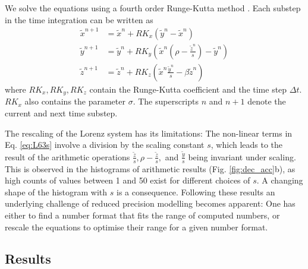 \documentclass[draft]{agujournal2019}
\begin{document}
We solve the equations using a fourth order Runge-Kutta method \cite{Butcher2008}. Each substep in the time integration can be written as 
\begin{subequations}
\begin{align}
\tilde{x}^{n+1} &= \tilde{x}^n + RK_x\left(\tilde{y}^n-\tilde{x}^n\right) \\
\tilde{y}^{n+1} &= \tilde{y}^n + RK_y\left(\tilde{x}^n(\rho - \frac{\tilde{z}^n}{s}) - \tilde{y}^n \right) \\
\tilde{z}^{n+1} &= \tilde{z}^n + RK_z\left(\tilde{x}^n\frac{\tilde{y}^n}{s} - \beta \tilde{z}^n\right)
\end{align}
\label{eq:L63s}%
\end{subequations}
where $RK_x,RK_y,RK_z$ contain the Runge-Kutta coefficient and the time step $\Delta t$.  $RK_x$ also contains the parameter $\sigma$. The superscripts $n$ and $n+1$ denote the current and next time substep.

The rescaling of the Lorenz system has its limitations: The non-linear terms in Eq. \ref{eq:L63s} involve a division by the scaling constant $s$, which leads to the result of the arithmetic operations $\tfrac{\tilde{z}}{s}, \rho - \tfrac{\tilde{z}}{s},$ and $\tfrac{\tilde{y}}{s}$ being invariant under scaling. This is observed in the histograms of arithmetic results (Fig. \ref{fig:dec_acc}b), as high counts of values between 1 and 50 exist for different choices of $s$. A changing shape of the histogram with $s$ is a consequence. Following these results an underlying challenge of reduced precision modelling becomes apparent: One has either to find a number format that fits the range of computed numbers, or rescale the equations to optimise their range for a given number format.

\subsection{Results}
\label{sec:lorenz}
\end{document}
